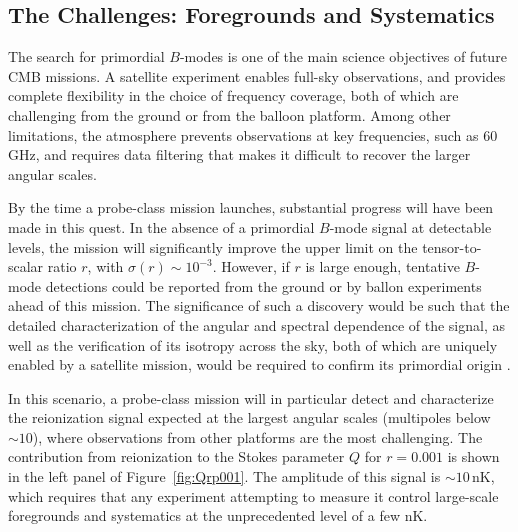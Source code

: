 \subsection{The Challenges: Foregrounds and Systematics}
\label{sec:foregrounds}
\vspace{-0.05in}


The search for primordial $B$-modes is one of the main science
objectives of future CMB missions. A satellite experiment enables
full-sky observations, and provides complete flexibility in the choice
of frequency coverage, both of which are challenging from the ground
or from the balloon platform.  Among other limitations, the atmosphere
prevents observations at key frequencies, such as 60\,GHz, and
requires data filtering that makes it difficult to recover the larger
angular scales.

By the time a probe-class mission launches, substantial progress will
have been made in this quest.  In the absence of a primordial $B$-mode
signal at detectable levels, the mission will significantly improve
the upper limit on the tensor-to-scalar ratio $r$, with
$\sigma(r)\!\sim\!10^{-3}$.  However, if $r$ is large enough,
tentative $B$-mode detections could be reported from the ground or by
ballon experiments ahead of this mission. The significance of such a
discovery would be such that the detailed characterization of the
angular and spectral dependence of the signal, as well as the
verification of its isotropy across the sky, both of which are
uniquely enabled by a satellite mission, would be required to confirm
its primordial origin .

In this scenario, a probe-class mission will in particular detect and
characterize the reionization signal expected at the largest angular
scales (multipoles below $\sim\!10$), where observations from other
platforms are the most challenging. The contribution from reionization
to the Stokes parameter $Q$ for $r=0.001$ is shown in the left panel
of Figure~\ref{fig:Qrp001}. The amplitude of this signal is
$\sim\!10$\,nK, which requires that any experiment attempting to
measure it control large-scale foregrounds and systematics at the
unprecedented level of a few nK.


